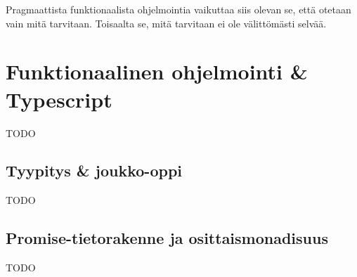 Pragmaattista funktionaalista ohjelmointia vaikuttaa siis olevan se, että otetaan vain mitä tarvitaan. Toisaalta se, mitä tarvitaan ei ole välittömästi selvää.

\section{Funktionaalinen ohjelmointi \& Typescript}

TODO






\subsection{Tyypitys \& joukko-oppi}

TODO





\subsection{Promise-tietorakenne ja osittaismonadisuus}

TODO


